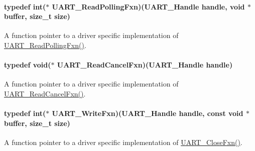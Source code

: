 \paragraph[{U\-A\-R\-T\-\_\-\-Read\-Polling\-Fxn}]{\setlength{\rightskip}{0pt plus 5cm}typedef int($\ast$ U\-A\-R\-T\-\_\-\-Read\-Polling\-Fxn)({\bf U\-A\-R\-T\-\_\-\-Handle} handle, void $\ast$buffer, size\-\_\-t size)}\label{_u_a_r_t_8h_a0528ac54e13ccc7be4a35e07a09196cb}


A function pointer to a driver specific implementation of \hyperlink{_u_a_r_t_8h_a0528ac54e13ccc7be4a35e07a09196cb}{U\-A\-R\-T\-\_\-\-Read\-Polling\-Fxn()}. 

\paragraph[{U\-A\-R\-T\-\_\-\-Read\-Cancel\-Fxn}]{\setlength{\rightskip}{0pt plus 5cm}typedef void($\ast$ U\-A\-R\-T\-\_\-\-Read\-Cancel\-Fxn)({\bf U\-A\-R\-T\-\_\-\-Handle} handle)}\label{_u_a_r_t_8h_a4a59d01e896c6a223ed56b251ca5b1bf}


A function pointer to a driver specific implementation of \hyperlink{_u_a_r_t_8h_a4a59d01e896c6a223ed56b251ca5b1bf}{U\-A\-R\-T\-\_\-\-Read\-Cancel\-Fxn()}. 

\paragraph[{U\-A\-R\-T\-\_\-\-Write\-Fxn}]{\setlength{\rightskip}{0pt plus 5cm}typedef int($\ast$ U\-A\-R\-T\-\_\-\-Write\-Fxn)({\bf U\-A\-R\-T\-\_\-\-Handle} handle, const void $\ast$buffer, size\-\_\-t size)}\label{_u_a_r_t_8h_afef1aa5e8050d49da2b07530e7f7b7d9}


A function pointer to a driver specific implementation of \hyperlink{_u_a_r_t_8h_a220a3f8443b9112ee98253078f92eb27}{U\-A\-R\-T\-\_\-\-Close\-Fxn()}. 

